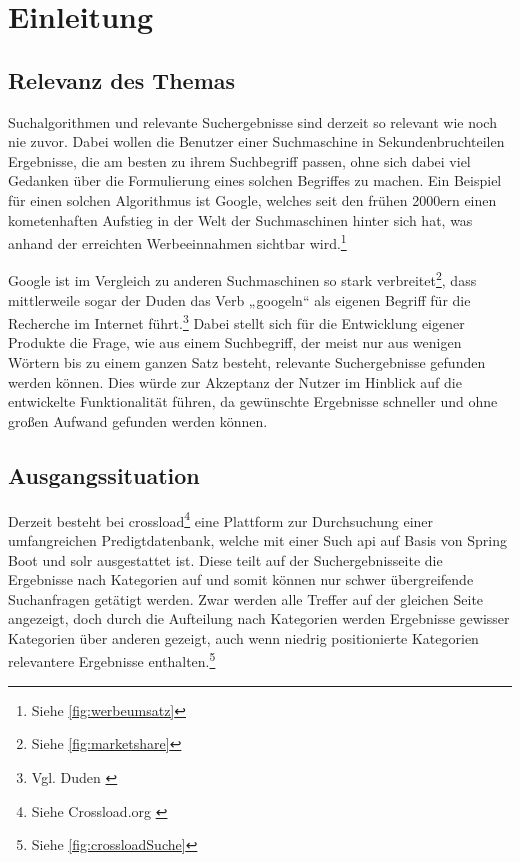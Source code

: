 \chapter{Einleitung}\label{ch:intro}

\section{Relevanz des Themas}
Suchalgorithmen und relevante Suchergebnisse sind derzeit so relevant wie noch nie zuvor.
Dabei wollen die Benutzer einer Suchmaschine in Sekundenbruchteilen Ergebnisse, die am besten zu ihrem Suchbegriff passen, ohne sich dabei viel Gedanken über die Formulierung eines solchen Begriffes zu machen.
Ein Beispiel für einen solchen Algorithmus ist Google, welches seit den frühen 2000ern einen kometenhaften Aufstieg in der Welt der Suchmaschinen hinter sich hat, was anhand der erreichten Werbeeinnahmen sichtbar wird.\footnote{Siehe \ref{fig:werbeumsatz}}

Google ist im Vergleich zu anderen Suchmaschinen so stark verbreitet\footnote{Siehe \ref{fig:marketshare}}, dass mittlerweile sogar der Duden das Verb „googeln“ als eigenen Begriff für die Recherche im Internet führt.\footnote{Vgl. Duden \cite{duden2022}}
Dabei stellt sich für die Entwicklung eigener Produkte die Frage, wie aus einem Suchbegriff, der meist nur aus wenigen Wörtern bis zu einem ganzen Satz besteht, relevante Suchergebnisse gefunden werden können. Dies würde zur Akzeptanz der Nutzer im Hinblick auf die entwickelte Funktionalität führen, da gewünschte Ergebnisse schneller und ohne großen Aufwand gefunden werden können.

\section{Ausgangssituation}
Derzeit besteht bei \gls{crossload}\footnote{Siehe Crossload.org \cite{pfleiderer2022}} eine Plattform zur Durchsuchung einer umfangreichen Predigtdatenbank, welche mit einer Such \gls{api} auf Basis von Spring Boot und \gls{solr} ausgestattet ist.
Diese teilt auf der Suchergebnisseite die Ergebnisse nach Kategorien auf und somit können nur schwer übergreifende Suchanfragen getätigt werden.
Zwar werden alle Treffer auf der gleichen Seite angezeigt, doch durch die Aufteilung nach Kategorien werden Ergebnisse gewisser Kategorien über anderen gezeigt, auch wenn niedrig positionierte Kategorien relevantere Ergebnisse enthalten.\footnote{Siehe \ref{fig:crossloadSuche}}


